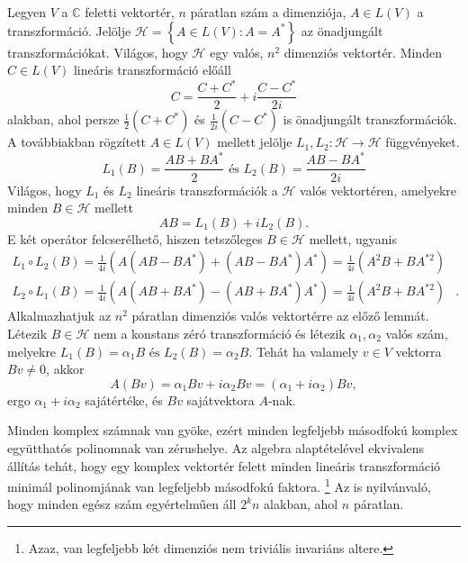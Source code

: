 \documentclass[9pt, showtrims]{memoir}
\makeatletter
\renewenvironment{proof}[1][\proofname]
    {\par\pushQED{\qed}%
    \normalfont \topsep6\p@\@plus6\p@\relax
    \trivlist
    \item[\hskip\labelsep
        \itshape
    #1\@addpunct{:}]\ignorespaces}
    {\popQED\endtrivlist\@endpefalse}
\theoremstyle{plain}
\theoremstyle{remark}
\theoremstyle{definition}
\makeatother
\begin{document}
\begin{proof}
    Legyen $V$ a $\mathbb{C}$ feletti vektortér, $n$ páratlan szám a dimenziója,
    $A\in L\left( V \right)$ a transzformáció.
    Jelölje $\mathcal{H}=\left\{ A\in L\left( V \right):A=A^* \right\}$ 
    az önadjungált transzformációkat.
    Világos, hogy $\mathcal{H}$ egy valós, $n^2$ dimenziós vektortér. 
    Minden $C\in L\left( V \right)$ lineáris transzformáció előáll
    \[
        C=
        \frac{C+C^*}{2}+
        i\frac{C-C^*}{2i}
    \]
    alakban, ahol persze 
    $\frac{1}{2}\left( C+C^* \right)$ és
    $\frac{1}{2i}\left( C-C^* \right)$ is önadjungált transzformációk.
    A továbbiakban rögzített $A\in L\left( V \right)$ mellett jelölje
    $L_1,L_2:\mathcal{H}\to\mathcal{H}$ függvényeket.
    \[
        L_1\left( B \right)=
        \frac{AB+BA^*}{2}
        \text{ és }
        L_2\left( B \right)=
        \frac{AB-BA^*}{2i}
    \]
    Világos, hogy $L_1$ és $L_2$ lineáris transzformációk a $\mathcal{H}$ valós
    vektortéren, 
    amelyekre minden $B\in \mathcal{H}$ mellett
    \[
        AB=L_1\left( B \right)+iL_2\left( B \right).
    \]
    E két operátor felcserélhető, hiszen tetszőleges $B\in\mathcal{H}$ mellett, ugyanis
    \begin{eqnarray*}
        L_1\circ L_2\left( B \right)=
        \frac{1}{4i}\left( A\left( AB-BA^* \right)+\left( AB-BA^* \right)A^* \right)=
        \frac{1}{4i}\left( A^2B+BA^{*2} \right)&&\\
        L_2\circ L_1\left( B \right)=
        \frac{1}{4i}\left( A\left( AB+BA^* \right)-\left( AB+BA^* \right)A^* \right)=
        \frac{1}{4i}\left( A^2B+BA^{*2} \right)&.&
    \end{eqnarray*}
    Alkalmazhatjuk az $n^2$ páratlan dimenziós valós vektortérre az előző lemmát.
    Létezik $B\in\mathcal{H}$ nem a konstans zéró transzformáció és
    létezik $\alpha_1,\alpha_2$ valós szám,
    melyekre 
    \(
        L_1\left( B \right)=\alpha_1B 
        \text{ és }
        L_2\left( B \right)=\alpha_2B.
    \)
    Tehát ha valamely $v\in V$ vektorra $Bv\neq 0$,
    akkor 
    \[
        A\left( Bv \right)=
        \alpha_1Bv+
        i\alpha_2Bv=
        \left(\alpha_1+i\alpha_2\right)Bv,
    \]
    ergo $\alpha_1+i\alpha_2$ sajátértéke, és $Bv$ sajátvektora $A$-nak.
\end{proof}

Minden komplex számnak van gyöke, ezért minden legfeljebb másodfokú komplex együtthatós
polinomnak van zérushelye.
Az algebra alaptételével ekvivalens állítás tehát, hogy egy komplex vektortér felett
minden lineáris transzformáció minimál polinomjának van legfeljebb másodfokú faktora.%
\footnote{Azaz, van legfeljebb két dimenziós nem triviális invariáns altere.}
Az is nyilvánvaló, hogy minden egész szám egyértelműen áll $2^kn$ alakban, ahol $n$ páratlan.
\end{document}
